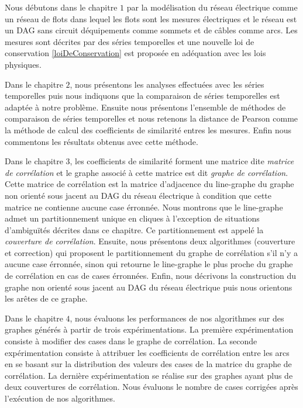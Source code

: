 \documentclass[onecolumn, 12pt]{book}
\begin{document}
Nous d\'ebutons dans le chapitre $1$ par la mod\'elisation du r\'eseau \'electrique comme un r\'eseau de flots dans lequel les flots sont les mesures \'electriques et le r\'eseau est un DAG sans circuit d\'equipements comme sommets et de c\^ables comme arcs. Les mesures sont d\'ecrites par des s\'eries temporelles et une nouvelle loi de conservation \ref{loiDeConservation} est propos\'ee en ad\'equation avec les lois physiques.
 \newline
 
 Dans le chapitre $2$, nous pr\'esentons les analyses effectu\'ees avec les s\'eries temporelles puis  nous indiquons que la comparaison de s\'eries temporelles est adapt\'ee \`a notre probl\`eme. Ensuite nous pr\'esentons l'ensemble de m\'ethodes de comparaison de s\'eries temporelles et nous retenons la distance de Pearson comme la m\'ethode de calcul des coefficients de similarit\'e  entres les mesures. Enfin nous commentons les r\'esultats obtenus avec cette m\'ethode.
 \newline
 
 Dans le chapitre $3$, les coefficients de similarit\'e forment une matrice dite {\em matrice de corr\'elation} et le graphe associ\'e \`a cette matrice est dit {\em graphe de corr\'elation}. Cette matrice de corr\'elation est la matrice d'adjacence du line-graphe du graphe non orient\'e sous jacent au DAG du r\'eseau \'electrique \`a condition que cette matrice ne contienne aucune case \'erronn\'ee. Nous montrons que le line-graphe admet un partitionnement unique en cliques \`a l'exception de situations d'ambigu\"{i}t\'es d\'ecrites dans ce chapitre. Ce partitionnement est appel\'e la {\em couverture de corr\'elation}.  
 Ensuite, nous pr\'esentons deux algorithmes (couverture et correction) qui proposent le partitionnement du graphe de corr\'elation s'il n'y a aucune case \'erronn\'ee, sinon qui retourne le line-graphe le plus proche du graphe de corr\'elation en cas de cases \'erronn\'ees.
 Enfin, nous d\'ecrivons la construction du graphe non orient\'e sous jacent au DAG du r\'eseau \'electrique puis nous orientons les ar\^etes de ce graphe.
 \newline
 
 Dans le chapitre $4$, nous \'evaluons les performances de nos algorithmes sur des graphes g\'en\'er\'es  \`a partir de trois exp\'erimentations. La premi\`ere exp\'erimentation consiste \`a modifier des cases dans le graphe de corr\'elation. La seconde exp\'erimentation consiste \`a attribuer les coefficients de corr\'elation entre les arcs en se basant sur la distribution des valeurs des cases de la matrice du graphe de corr\'elation. La derni\`ere  exp\'erimentation se r\'ealise sur des graphes ayant plus de deux couvertures de corr\'elation. 
Nous \'evaluons le nombre de cases corrig\'ees apr\`es l'ex\'ecution de nos algorithmes.
 
 
 
 
\end{document}
